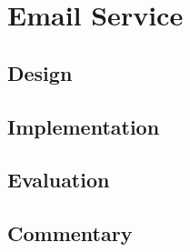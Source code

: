 \section{Email Service}
\label{sec:email}


\subsection{Design}

\subsection{Implementation}

\subsection{Evaluation}

\subsection{Commentary}